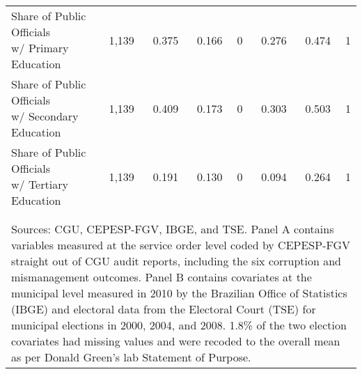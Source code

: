 \documentclass[border = 1pt]{standalone}
\begin{document}
\begin{tabular}{@{\extracolsep{6pt}}lrrrrrrr}
\makecell[cl]{Share of Public Officials \\[1.0ex] \hspace{4pt}w/ Primary Education}   & 1,139 & 0.375 & 0.166 & 0 & 0.276 & 0.474 & 1 \\
\makecell[cl]{Share of Public Officials \\[1.0ex] \hspace{4pt}w/ Secondary Education} & 1,139 & 0.409 & 0.173 & 0 & 0.303 & 0.503 & 1 \\
\makecell[cl]{Share of Public Officials \\[1.0ex] \hspace{4pt}w/ Tertiary Education}  & 1,139 & 0.191 & 0.130 & 0 & 0.094 & 0.264 & 1 \\
\\[-1.8ex]\hline
\hline \\[-1.8ex]
\multicolumn{8}{p{12cm}}{Sources: CGU, CEPESP-FGV, IBGE, and TSE. Panel A contains variables measured at the service order level coded by CEPESP-FGV straight out of CGU audit reports, including the six corruption and mismanagement outcomes. Panel B contains covariates at the municipal level measured in 2010 by the Brazilian Office of Statistics (IBGE) and electoral data from the Electoral Court (TSE) for municipal elections in 2000, 2004, and 2008. 1.8\% of the two election covariates had missing values and were recoded to the overall mean as per Donald Green's lab Statement of Purpose.}
\end{tabular}
\end{document}
